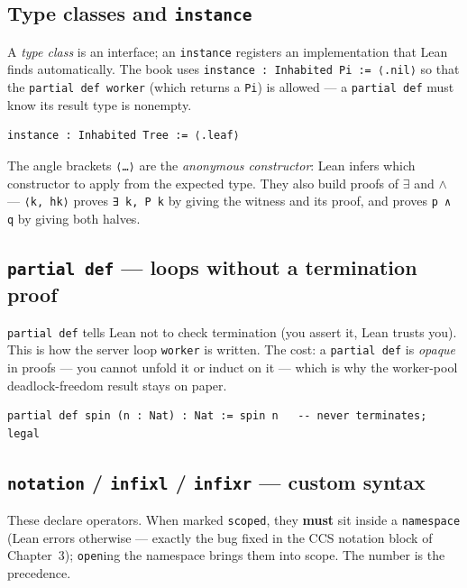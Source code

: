 \documentclass[11pt, a4paper, oneside]{book}
\newcommand{\lc}[1]{\texttt{#1}}
\begin{document}
\subsection*{Type classes and \lc{instance}}

A \emph{type class} is an interface; an \lc{instance} registers an
implementation that Lean finds automatically. The book uses
\lc{instance : Inhabited Pi := ⟨.nil⟩} so that the \lc{partial def worker}
(which returns a \lc{Pi}) is allowed --- a \lc{partial def} must know its
result type is nonempty.

\begin{leanbox}
\begin{verbatim}
instance : Inhabited Tree := ⟨.leaf⟩
\end{verbatim}
\end{leanbox}

The angle brackets \lc{⟨…⟩} are the \emph{anonymous constructor}: Lean infers
which constructor to apply from the expected type. They also build proofs of
$\exists$ and $\land$ --- \lc{⟨k, hk⟩} proves \lc{∃ k, P k} by giving the
witness and its proof, and proves \lc{p ∧ q} by giving both halves.

\subsection*{\lc{partial def} --- loops without a termination proof}

\lc{partial def} tells Lean not to check termination (you assert it, Lean trusts
you). This is how the server loop \lc{worker} is written. The cost: a
\lc{partial def} is \emph{opaque} in proofs --- you cannot unfold it or induct on
it --- which is why the worker-pool deadlock-freedom result stays on paper.

\begin{leanbox}
\begin{verbatim}
partial def spin (n : Nat) : Nat := spin n   -- never terminates; legal
\end{verbatim}
\end{leanbox}

\subsection*{\lc{notation} / \lc{infixl} / \lc{infixr} --- custom syntax}

These declare operators. When marked \lc{scoped}, they \textbf{must} sit inside
a \lc{namespace} (Lean errors otherwise --- exactly the bug fixed in the CCS
notation block of Chapter~3); \lc{open}ing the namespace brings them into scope.
The number is the precedence.
\end{document}
